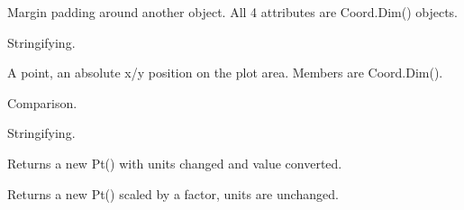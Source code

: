 \documentclass[letterpaper,10pt,english]{sphinxmanual}
\begin{document}
\begin{fulllineitems}
\label{\detokenize{ref/util/plot/Coord:TotalDepth.util.plot.Coord.Margin}}
Margin padding around another object. All 4 attributes are Coord.Dim()
objects.

\begin{fulllineitems}
\label{\detokenize{ref/util/plot/Coord:TotalDepth.util.plot.Coord.Margin.__str__}}
Stringifying.

\end{fulllineitems}


\end{fulllineitems}


\begin{fulllineitems}
\label{\detokenize{ref/util/plot/Coord:TotalDepth.util.plot.Coord.Pt}}
A point, an absolute x/y position on the plot area.
Members are Coord.Dim().

\begin{fulllineitems}
\label{\detokenize{ref/util/plot/Coord:TotalDepth.util.plot.Coord.Pt.__eq__}}
Comparison.

\end{fulllineitems}


\begin{fulllineitems}
\label{\detokenize{ref/util/plot/Coord:TotalDepth.util.plot.Coord.Pt.__str__}}
Stringifying.

\end{fulllineitems}


\begin{fulllineitems}
\label{\detokenize{ref/util/plot/Coord:TotalDepth.util.plot.Coord.Pt.convert}}
Returns a new Pt() with units changed and value converted.

\end{fulllineitems}


\begin{fulllineitems}
\label{\detokenize{ref/util/plot/Coord:TotalDepth.util.plot.Coord.Pt.scale}}
Returns a new Pt() scaled by a factor, units are unchanged.

\end{fulllineitems}


\end{fulllineitems}
\end{document}
